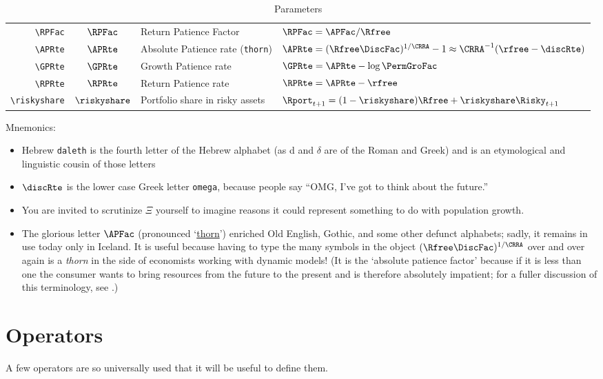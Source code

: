 \documentclass[12pt]{\econtex}
\begin{document}
\begin{table}[ht]
\begin{tabular}{|>{\ttfamily}rcll|}
    \\ \verb|\RPFac| & $\RPFac$ & Return Patience Factor & $\RPFac = \APFac/\Rfree $ 
    \\ \verb|\APRte|  & $\APRte$ & Absolute Patience rate (\texttt{thorn}) & $\APRte = (\Rfree \DiscFac)^{1/\CRRA}-1 \approx \CRRA^{-1}(\rfree-\discRte) $
    \\ \verb|\GPRte| & $\GPRte$ & Growth Patience rate  & $\GPRte = \APRte - \log \PermGroFac $
    \\ \verb|\RPRte| & $\RPRte$ & Return Patience rate  & $\RPRte =\APRte -\rfree $
    \\ \verb|\riskyshare|  & $\riskyshare$ & Portfolio share in risky assets & $\Rport_{t+1}=(1-\riskyshare)\Rfree+\riskyshare\Risky_{t+1}$
    \\	\hline
  \end{tabular}
  \caption{Parameters}
  \label{table:Parameters}
\end{table}	

Mnemonics:
\begin{itemize}
\item Hebrew \texttt{daleth} is the fourth letter of the Hebrew alphabet (as d and $\delta$ are of the Roman and Greek) and is an etymological and linguistic cousin of those letters
\item $\discRte$ is the lower case Greek letter \texttt{omega}, because people say ``OMG, I've got to think about the future.''
\item You are invited to scrutinize $\Xi$ yourself to imagine reasons it could represent something to do with population growth.  
\item The glorious letter $\APFac$ (pronounced `\href{http://en.wikipedia.org/wiki/Thorn_(letter)}{thorn}') enriched Old English, Gothic, and some other defunct alphabets; sadly, it remains in use today only in Iceland.  It is useful because having to type the many symbols in the object $(\Rfree \DiscFac)^{1/\CRRA}$ over and over again is a \textit{thorn} in the side of economists working with dynamic models!  (It is the `absolute patience factor' because if it is less than one the consumer wants to bring resources from the future to the present and is therefore absolutely impatient; for a fuller discussion of this terminology, see \cite{carrollTractable}.)
\end{itemize}


\hypertarget{Operators}{}
\section{Operators}
A few operators are so universally used that it will be useful to define them.
\end{document}
